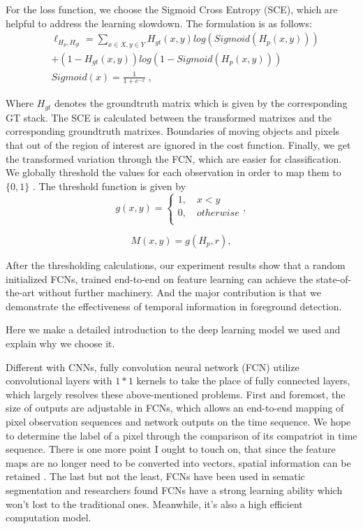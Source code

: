 \documentclass[journal]{IEEEtran}
\begin{document}
For the loss function, we choose the Sigmoid Cross Entropy (SCE), which are helpful to address the learning slowdown. 
The formulation is as follows:
\begin{equation}
    \begin{aligned}
        & \ell_{H_p, H_{gt}} =  \sum\limits_{x \in X, y \in Y}^{} H_{gt}(x,y) log(Sigmoid(H_p(x,y)))  \\
        & + (1 - H_{gt}(x,y)) log(1 - Sigmoid(H_p(x,y))) \\
        & Sigmoid(x) =\frac{1}{1+e^{-x}}\  ,
    \end{aligned}
\end{equation}

Where $H_{gt}$ denotes the groundtruth matrix which is given by the corresponding GT stack. 
The SCE is calculated between the transformed matrixes and the corresponding groundtruth matrixes. 
Boundaries of moving objects and pixels that out of the region of interest are ignored in the cost function.
Finally, we get the transformed variation through the FCN, which are easier for classification. 
We globally threshold the values for each observation in order to map them to $\{0,1\}$ . 
The threshold function is given by
\begin{equation}
    \label{piecewise_fg}
    g(x,y) =
 \begin{cases}
  1,  \quad x < y       \\
  0,  \quad otherwise   \\
\end{cases},
\end{equation}

\begin{equation}
M(x,y)=g(H_p,r) ,
\end{equation}

After the thresholding calculations, our experiment results show that a random initialized FCNs, trained end-to-end on feature learning can achieve the state-of-the-art without further machinery. 
And the major contribution is that we demonstrate the effectiveness of temporal information in foreground detection.

Here we make a detailed introduction to the deep learning model we used and explain why we choose it.

Different with CNNs, fully convolution neural network (FCN) utilize convolutional layers with $1*1$ kernels to take the place of fully connected layers, which largely resolves these above-mentioned problems. 
First and foremost, the size of outputs are adjustable in FCNs, which allows an end-to-end mapping of pixel observation sequences and network outputs on the time sequence. 
We hope to determine the label of a pixel through the comparison of its compatriot in time sequence. 
There is one more point I ought to touch on, that since the feature maps are no longer need to be converted into vectors, spatial information can be retained . 
The last but not the least, FCNs have been used in sematic segmentation and researchers found FCNs have a strong learning ability which won't lost to the traditional ones. 
Meanwhile, it's also a high efficient computation model. 
\end{document}
